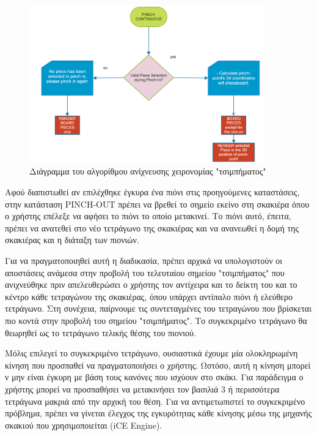 \begin{figure}[H]
    \centering
    \includegraphics[width=0.9\textwidth]{Files/Figures/pinch_continuous_state.png}
    \caption[Διάγραμμα του αλγορίθμου ανίχνευσης χειρονομίας "τσιμπήματος"]{Διάγραμμα του αλγορίθμου ανίχνευσης χειρονομίας "τσιμπήματος"}
    \label{fig:gesture_rec}
\end{figure}



Αφού διαπιστωθεί αν επιλέχθηκε έγκυρα ένα πιόνι στις προηγούμενες καταστάσεις, στην κατάσταση PINCH-OUT πρέπει να βρεθεί το σημείο εκείνο στη σκακιέρα όπου ο χρήστης επέλεξε να αφήσει το πιόνι το οποίο μετακινεί. Το πιόνι αυτό, έπειτα, πρέπει να ανατεθεί στο νέο τετράγωνο της σκακιέρας και να ανανεωθεί η δομή της σκακιέρας και η διάταξη των πιονιών.

Για να πραγματοποιηθεί αυτή η διαδικασία, πρέπει αρχικά να υπολογιστούν οι αποστάσεις ανάμεσα στην προβολή του τελευταίου σημείου "τσιμπήματος" που ανιχνεύθηκε πριν απελευθερώσει ο χρήστης τον αντίχειρα και το δείκτη του και το κέντρο κάθε τετραγώνου της σκακιέρας, όπου υπάρχει αντίπαλο πιόνι ή ελεύθερο τετράγωνο. Στη συνέχεια, παίρνουμε τις συντεταγμένες του τετραγώνου που βρίσκεται πιο κοντά στην προβολή του σημείου "τσιμπήματος". Το συγκεκριμένο τετράγωνο θα θεωρηθεί ως το τετράγωνο τελικής θέσης του πιονιού. 


Μόλις επιλεγεί το συγκεκριμένο τετράγωνο, ουσιαστικά έχουμε μία ολοκληρωμένη κίνηση που προσπαθεί να πραγματοποιήσει ο χρήστης. Ωστόσο, αυτή η κίνηση μπορεί ν μην είναι έγκυρη με βάση τους κανόνες που ισχύουν στο σκάκι. Για παράδειγμα ο χρήστης μπορεί να προσπαθήσει να μετακινήσει τον βασιλιά 3 ή περισσότερα τετράγωνα μακριά από την αρχική του θέση. Για να αντιμετωπιστεί το συγκεκριμένο πρόβλημα, πρέπει να γίνεται έλεγχος της εγκυρότητας κάθε κίνησης μέσω της μηχανής σκακιού που χρησιμοποιείται (iCE Engine). 


